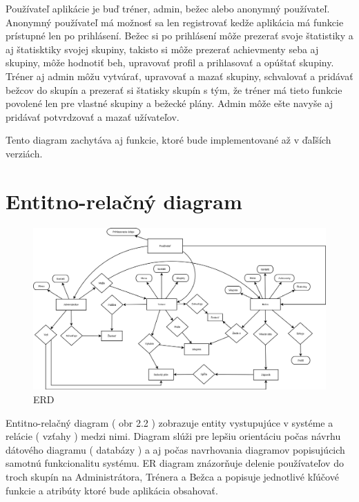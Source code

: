 \documentclass[12pt,a4paper]{report}
\theoremstyle{definition}
\theoremstyle{remark}
\begin{document}
Používateľ aplikácie je buď tréner, admin, bežec alebo anonymný používateľ. Anonymný používateľ má možnosť sa len registrovať kedže aplikácia má funkcie prístupné len po prihlásení. Bežec si po prihlásení môže prezerať svoje štatistiky a aj štatisktiky svojej skupiny, takisto si môže prezerať  achievmenty seba aj skupiny, môže hodnotiť beh, upravovať profil a prihlasovať a opúštať skupiny. Tréner aj admin môžu vytvárať, upravovať a mazať skupiny, schvalovať a pridávať bežcov do skupín a prezerať si štatisky skupín s tým, že tréner má tieto funkcie povolené len pre vlastné skupiny a bežecké plány. Admin môže ešte navyše aj pridávať potvrdzovať a mazať užívateľov.

Tento diagram zachytáva aj funkcie, ktoré bude implementované až v ďaľších verziách.

\newpage
\section{Entitno-relačný diagram}
\begin{figure}[H]
\centering
\includegraphics[width=\textwidth]{ERdiagram.png}
\caption{ERD}
\end{figure}

Entitno-relačný diagram ( obr 2.2 ) zobrazuje entity vystupujúce v systéme a relácie ( vzťahy ) medzi nimi. Diagram slúži pre lepšiu orientáciu počas návrhu dátového diagramu ( databázy ) a aj počas navrhovania diagramov popisujúcich samotnú funkcionalitu systému. ER diagram znázorňuje delenie používateľov do troch skupín na Administrátora, Trénera a Bežca a popisuje jednotlivé kľúčové funkcie a atribúty ktoré bude aplikácia obsahovať.

 \newpage
\end{document}
